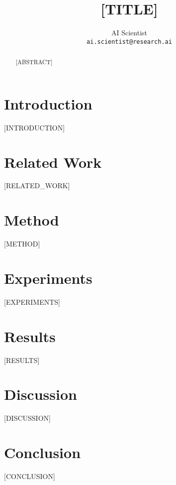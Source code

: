 \documentclass[10pt,twocolumn,letterpaper]{article}
\begin{document}
\title{[TITLE]}

\author{AI Scientist\\
{\tt\small ai.scientist@research.ai}
}

\maketitle

\begin{abstract}
[ABSTRACT]
\end{abstract}

\section{Introduction}
[INTRODUCTION]

\section{Related Work}
[RELATED_WORK]

\section{Method}
[METHOD]

\section{Experiments}
[EXPERIMENTS]

\section{Results}
[RESULTS]

\section{Discussion}
[DISCUSSION]

\section{Conclusion}
[CONCLUSION]

{\small


}
\end{document}
